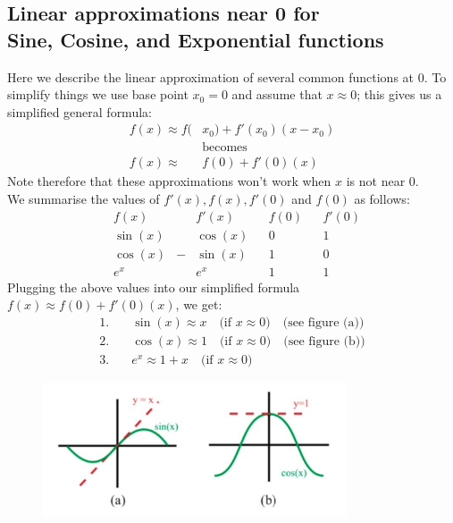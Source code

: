 \documentclass{report}
\begin{document}
\subsection{Linear approximations near 0 for\\ Sine, Cosine, and Exponential functions} %
Here we describe the linear approximation of several common functions at 0. 
To simplify things we use base point $x_0=0$ and assume that $x\approx 0$; this gives us 
a simplified general formula:
\begin{align*}
f(x)\approx f(&x_0)+f'(x_0)(x-x_0)\\
&\text{becomes}\\
f(x)\approx &f(0)+f'(0)(x)
\end{align*}
Note therefore that these approximations won't work when $x$ is not near 0.\\
We summarise the values of $f'(x),f(x),f'(0)$ and $f(0)$ as follows:
\begin{align*}
&f(x)    & &f'(x)    & &f(0) & &f'(0)\\
&\sin(x) & &\cos(x)  & &0    & &1\\
&\cos(x) & -&\sin(x) & &1    & &0\\
&e^x     & &e^x      & &1    & &1
\end{align*}
Plugging the above values into our simplified formula $
f(x)\approx f(0)+f'(0)(x)$, we get:
\begin{align*}
1.&\quad\sin(x)\approx x\quad\text{(if $x\approx 0$)}\quad\text{(see figure (a))}\\
2.&\quad\cos(x)\approx 1\quad\text{(if $x\approx 0$)}\quad\text{(see figure (b))}\\
3.&\quad e^x\approx 1+x\quad\text{(if $x\approx 0$)}
\end{align*}
\begin{figure}[h]
\includegraphics[width=9cm]{Capture20}
\centering
{}
\end{figure}
\newpage
\end{document}
